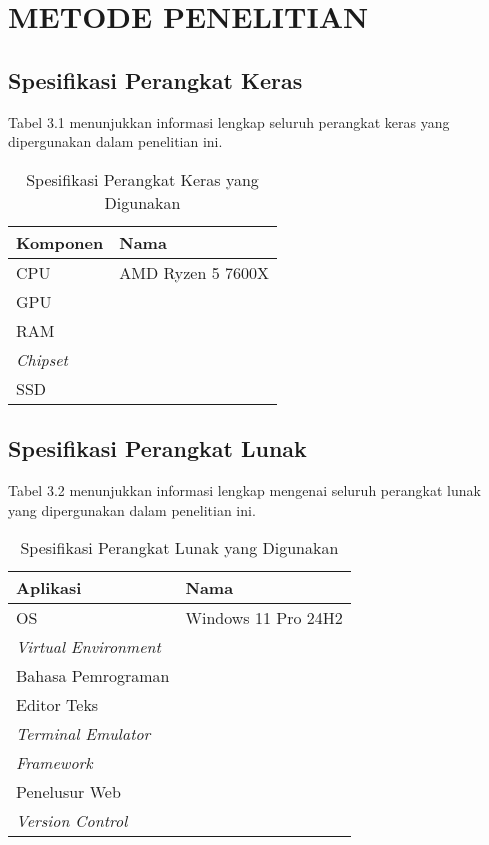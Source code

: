 \chapter{METODE PENELITIAN}

\section{Spesifikasi Perangkat Keras}

Tabel 3.1 menunjukkan informasi lengkap seluruh perangkat keras yang
dipergunakan dalam penelitian ini.

\begin{table}[H]
  \caption{Spesifikasi Perangkat Keras yang Digunakan}

  \centering{}%
  \begin{tabular}{|l|l|}
    \hline
    \textbf{Komponen} & \textbf{Nama}\tabularnewline
    \hline
    \hline
    CPU               & AMD Ryzen 5 7600X\tabularnewline
    \hline
    GPU               & \tabularnewline
    \hline
    RAM               & \tabularnewline
    \hline
    \emph{Chipset}    & \tabularnewline
    \hline
    SSD               & \tabularnewline
    \hline
  \end{tabular}
\end{table}


\section{Spesifikasi Perangkat Lunak}

Tabel 3.2 menunjukkan informasi lengkap mengenai seluruh perangkat
lunak yang dipergunakan dalam penelitian ini.

\begin{table}[H]
  \caption{Spesifikasi Perangkat Lunak yang Digunakan}

  \centering{}%
  \begin{tabular}{|l|l|}
    \hline
    \textbf{Aplikasi}          & \textbf{Nama}\tabularnewline
    \hline
    \hline
    OS                         & Windows 11 Pro 24H2\tabularnewline
    \hline
    \emph{Virtual Environment} & \tabularnewline
    \hline
    Bahasa Pemrograman         & \tabularnewline
    \hline
    Editor Teks                & \tabularnewline
    \hline
    \emph{Terminal Emulator}   & \tabularnewline
    \hline
    \emph{Framework}           & \tabularnewline
    \hline
    Penelusur Web              & \tabularnewline
    \hline
    \emph{Version Control}     & \tabularnewline
    \hline
  \end{tabular}
\end{table}

